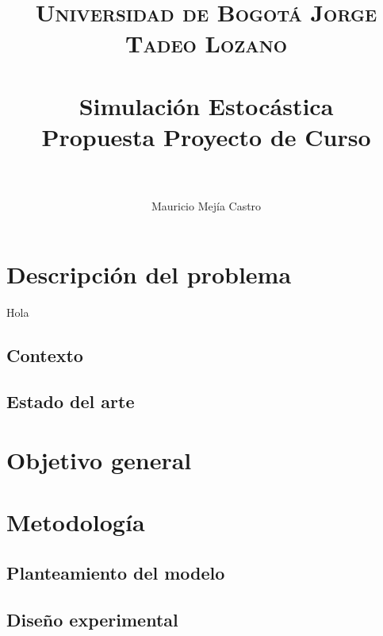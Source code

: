 \documentclass[11pt,letterpaper]{scrartcl}
\title{
	\usefont{OT1}{bch}{b}{n}
	\normalfont \normalsize \textsc{Universidad de Bogotá Jorge Tadeo Lozano} \\ [25pt]
	\horrule{0.5pt} \\[0.4cm]
	\huge Simulación Estocástica \\ Propuesta Proyecto de Curso \\
	\horrule{2pt} \\[0.5cm]
}
\author{Mauricio Mejía Castro}
\begin{document}
	\maketitle
	\tableofcontents
	
	\section{Descripción del problema}
	Hola \cite{ross2014introduction}
		\subsection{Contexto}
		\subsection{Estado del arte}
	\section{Objetivo general}
	\section{Metodología}
		\subsection{Planteamiento del modelo}
		\subsection{Diseño experimental}
	
	
	
	
\end{document}
